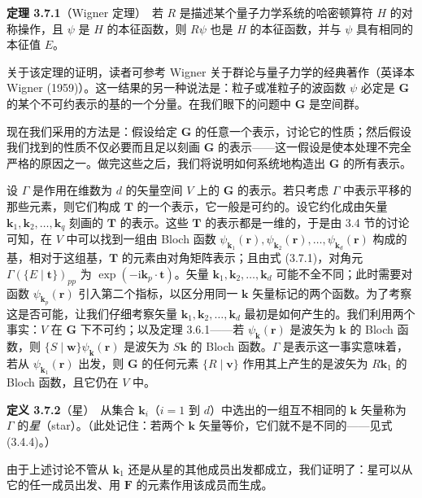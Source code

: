 \noindent\textbf{定理 3.7.1}\quad （Wigner 定理）\ 若 $R$ 是描述某个量子力学系统的哈密顿算符 $H$ 的对称操作，且 $\psi$ 是 $H$ 的本征函数，则 $R\psi$ 也是 $H$ 的本征函数，并与 $\psi$ 具有相同的本征值 $E$。

关于该定理的证明，读者可参考 Wigner 关于群论与量子力学的经典著作（英译本 Wigner (1959)）。这一结果的另一种说法是：粒子或准粒子的波函数 $\psi$ 必定是 $\mathbf{G}$ 的某个不可约表示的基的一个分量。在我们眼下的问题中 $\mathbf{G}$ 是空间群。

现在我们采用的方法是：假设给定 $\mathbf{G}$ 的任意一个表示，讨论它的性质；然后假设我们找到的性质不仅必要而且足以刻画 $\mathbf{G}$ 的表示——这一假设是使本处理不完全严格的原因之一。做完这些之后，我们将说明如何系统地构造出 $\mathbf{G}$ 的所有表示。

设 $\Gamma$ 是作用在维数为 $d$ 的矢量空间 $V$ 上的 $\mathbf{G}$ 的表示。若只考虑 $\Gamma$ 中表示平移的那些元素，则它们构成 $\mathbf{T}$ 的一个表示，它一般是可约的。设它约化成由矢量 $\mathbf{k}_{1}, \mathbf{k}_{2}, \dots, \mathbf{k}_{q}$ 刻画的 $\mathbf{T}$ 的表示。这些 $\mathbf{T}$ 的表示都是一维的，于是由 3.4 节的讨论可知，在 $V$ 中可以找到一组由 Bloch 函数 $\psi_{\mathbf{k}_{1}}(\mathbf{r}), \psi_{\mathbf{k}_{2}}(\mathbf{r}), \dots, \psi_{\mathbf{k}_{d}}(\mathbf{r})$ 构成的基，相对于这组基，$\mathbf{T}$ 的元素由对角矩阵表示；且由式 (3.7.1)，对角元 $\Gamma(\{E \mid \mathbf{t}\})_{pp}$ 为 $\exp(-\mathrm{i}\mathbf{k}_{p} \cdot \mathbf{t})$。矢量 $\mathbf{k}_{1}, \mathbf{k}_{2}, \dots, \mathbf{k}_{d}$ 可能不全不同；此时需要对函数 $\psi_{\mathbf{k}_{p}}(\mathbf{r})$ 引入第二个指标，以区分用同一 $\mathbf{k}$ 矢量标记的两个函数。为了考察这是否可能，让我们仔细考察矢量 $\mathbf{k}_{1}, \mathbf{k}_{2}, \dots, \mathbf{k}_{d}$ 最初是如何产生的。我们利用两个事实：$V$ 在 $\mathbf{G}$ 下不可约；以及定理 3.6.1——若 $\psi_{\mathbf{k}}(\mathbf{r})$ 是波矢为 $\mathbf{k}$ 的 Bloch 函数，则 $\{S \mid \mathbf{w}\}\psi_{\mathbf{k}}(\mathbf{r})$ 是波矢为 $S\mathbf{k}$ 的 Bloch 函数。$\Gamma$ 是表示这一事实意味着，若从 $\psi_{\mathbf{k}_{1}}(\mathbf{r})$ 出发，则 $\mathbf{G}$ 的任何元素 $\{R \mid \mathbf{v}\}$ 作用其上产生的是波矢为 $R\mathbf{k}_{1}$ 的 Bloch 函数，且它仍在 $V$ 中。

\noindent\textbf{定义 3.7.2}\quad （星）\ 从集合 $\mathbf{k}_{i}$（$i = 1$ 到 $d$）中选出的一组互不相同的 $\mathbf{k}$ 矢量称为 $\Gamma$ 的\textit{星}（star）。（此处记住：若两个 $\mathbf{k}$ 矢量等价，它们就不是不同的——见式 (3.4.4)。）

由于上述讨论不管从 $\mathbf{k}_{1}$ 还是从星的其他成员出发都成立，我们证明了：星可以从它的任一成员出发、用 $\mathbf{F}$ 的元素作用该成员而生成。

